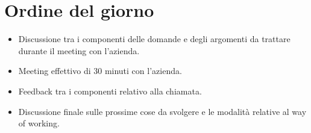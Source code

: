 \section{Ordine del giorno}
\begin{itemize}
    \item Discussione tra i componenti delle domande e degli argomenti da trattare durante il meeting con l'azienda.
    \item Meeting effettivo di 30 minuti con l'azienda.
    \item Feedback tra i componenti relativo alla chiamata.
    \item Discussione finale sulle prossime cose da svolgere e le modalità relative al way of working.
\end{itemize}